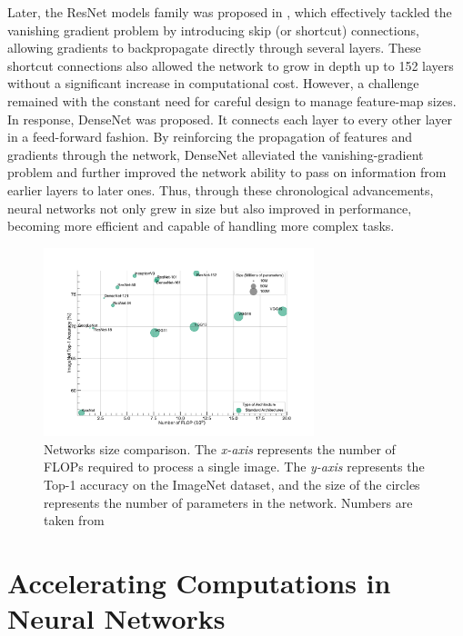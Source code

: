 Later, the ResNet models family was proposed in \cite{DBLP:conf/cvpr/HeZRS16},
which effectively tackled the vanishing gradient problem by introducing skip (or
shortcut) connections, allowing gradients to backpropagate directly through
several layers. These shortcut connections also allowed the network to grow in
depth up to 152 layers without a significant increase in computational cost.
However, a challenge remained with the constant need for careful design to
manage feature-map sizes.\\

In response, DenseNet \cite{huang2017densely} was proposed. It connects each
layer to every other layer in a feed-forward fashion. By reinforcing the
propagation of features and gradients through the network, DenseNet alleviated
the vanishing-gradient problem and further improved the network ability
to pass on information from earlier layers to later ones. Thus, through these
chronological advancements, neural networks not only grew in size but also
improved in performance, becoming more efficient and capable of handling more
complex tasks.

\begin{figure}[htbp]
    \centering
    \includegraphics[width=0.7\textwidth]{chapter_sota/assets/network_sizes_normal.pdf}
    \caption{Networks size comparison. The \emph{x-axis} represents the number
    of \acp{FLOP} required to process a single image. The \emph{y-axis}
    represents the Top-1 accuracy on the ImageNet \cite{deng2009imagenet}
    dataset, and the size of the circles represents the number of parameters in
    the network. Numbers are taken from \cite{pytorch_vision}}
    \label{fig:sota:net_sizes}
\end{figure}

\section{Accelerating Computations in Neural Networks}\label{sec:sota:fast_convolutions}


